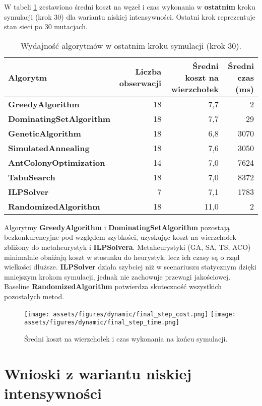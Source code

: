 W tabeli \ref{tab:dynamic_final_step} zestawiono średni koszt na węzeł i czas wykonania w \textbf{ostatnim} kroku symulacji (krok 30) dla wariantu niskiej intensywności. Ostatni krok reprezentuje stan sieci po 30 mutacjach.

\begin{table}[H]
\centering
\begin{tabular}{|l|r|r|r|}
\hline
\textbf{Algorytm} & \textbf{Liczba obserwacji} & \textbf{Średni koszt na wierzchołek} & \textbf{Średni czas (ms)} \\
\hline
\textbf{GreedyAlgorithm} & 18 & 7,7 & 2 \\
\textbf{DominatingSetAlgorithm} & 18 & 7,7 & 29 \\
\textbf{GeneticAlgorithm} & 18 & 6,8 & 3070 \\
\textbf{SimulatedAnnealing} & 18 & 7,6 & 3050 \\
\textbf{AntColonyOptimization} & 14 & 7,0 & 7624 \\
\textbf{TabuSearch} & 18 & 7,0 & 8372 \\
\textbf{ILPSolver} & 7 & 7,1 & 1783 \\
\textbf{RandomizedAlgorithm} & 18 & 11,0 & 2 \\
\hline
\end{tabular}
\caption{Wydajność algorytmów w ostatnim kroku symulacji (krok 30).}
\label{tab:dynamic_final_step}
\end{table}

Algorytmy \textbf{GreedyAlgorithm} i \textbf{DominatingSetAlgorithm} pozostają bezkonkurencyjne pod względem szybkości, uzyskując koszt na wierzchołek zbliżony do metaheurystyk i \textbf{ILPSolvera}. Metaheurystyki (GA, SA, TS, ACO) minimalnie obniżają koszt w stosunku do heurystyk, lecz ich czasy są o rząd wielkości dłuższe. \textbf{ILPSolver} działa szybciej niż w scenariuszu statycznym dzięki mniejszym krokom symulacji, jednak nie zachowuje przewagi jakościowej. Baseline \textbf{RandomizedAlgorithm} potwierdza skuteczność wszystkich pozostałych metod.

\begin{figure}[H]
  \centering
  \texttt{[image: assets/figures/dynamic/final\_step\_cost.png]}
  \texttt{[image: assets/figures/dynamic/final\_step\_time.png]}
  \caption{Średni koszt na wierzchołek i czas wykonania na końcu symulacji.}
  \label{fig:dynamic_final_bars}
\end{figure}

\section{Wnioski z wariantu niskiej intensywności}

